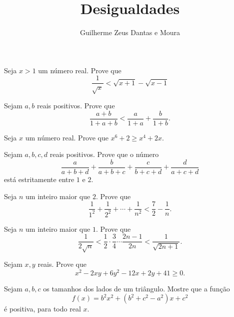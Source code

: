 \documentclass[10pt,a4paper]{article}
\title{Desigualdades}
\author{Guilherme Zeus Dantas e Moura}
\begin{document}
	

	\begin{prob}
		Seja $x > 1$ um número real. Prove que
		\[
			\frac{1}{\sqrt{x}} < \sqrt{x+1} - \sqrt{x-1}
		\]
	\end{prob}

	\begin{prob}
		Sejam $a, b$ reais positivos. Prove que
		\[
			\frac{a+b}{1+a+b} < \frac{a}{1+a} + \frac{b}{1+b}.
		\]
	\end{prob}

	\begin{prob}
		Seja $x$ um número real. Prove que $
			x^6 + 2 \ge x^4 + 2x.
		$
	\end{prob}

	\begin{prob}
		Sejam $a, b, c, d $ reais positivos. Prove que o número \[
			\frac{a}{a + b + d} + 
			\frac{b}{a + b + c} + 
			\frac{c}{b + c + d} + 
			\frac{d}{a + c + d}
		\]
		está estritamente entre $1$ e $2$.
	\end{prob}

	\begin{prob}
		Seja $n$ um inteiro maior que $2$. Prove que \[
			\frac{1}{1^2} + \frac{1}{2^2} + \cdots + \frac{1}{n^2} < \frac{7}{2} - \frac{1}{n}.
		\]
	\end{prob}

	\begin{prob}
		Seja $n$ um inteiro maior que $1$. Prove que \[
			\frac{1}{2\sqrt{n}} < \frac{1}{2}\cdot\frac{3}{4}\cdots\frac{2n-1}{2n} < \frac{1}{\sqrt{2n+1}}.
		\]
	\end{prob}

	\begin{prob}
		Sejam $x, y$ reais. Prove que \[
			x^2 - 2xy + 6y^2 - 12x + 2y + 41 \ge 0.
		\]
	\end{prob}

	\begin{prob}
		Sejam $a, b, c$ os tamanhos dos lados de um triângulo. Mostre que a função \[
			f(x) = b^2x^2 + \left(b^2 + c^2 - a^2\right)x + c^2
		\]
		é positiva, para todo real $x$.
	\end{prob}
\end{document}
